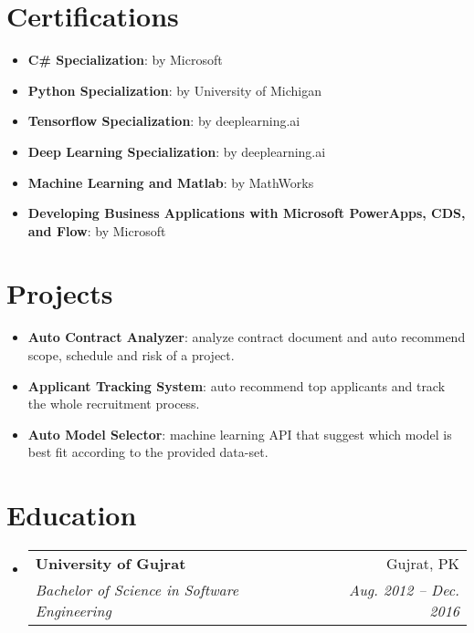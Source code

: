 \documentclass[letterpaper,11pt]{article}
\makeatletter
\newcommand{\resumeItem}[2]{
  \item\small{
    \textbf{#1}{: #2 \vspace{-2pt}}
  }
}
\newcommand{\resumeSubheading}[4]{
  \vspace{-1pt}\item
    \begin{tabular*}{0.97\textwidth}[t]{l@{\extracolsep{\fill}}r}
      \textbf{#1} & #2 \\
      \textit{\small#3} & \textit{\small #4} \\
    \end{tabular*}\vspace{-5pt}
}
\newcommand{\resumeSubItem}[2]{\resumeItem{#1}{#2}\vspace{-4pt}}
\newcommand{\resumeSubHeadingListStart}{\begin{itemize}[leftmargin=*]}
\newcommand{\resumeSubHeadingListEnd}{\end{itemize}}
\makeatother
\begin{document}
\section{Certifications}
  \resumeSubHeadingListStart
   \resumeSubItem{C\# Specialization}
      {by Microsoft}
       \resumeSubItem{Python Specialization}
      {by University of Michigan}
        \resumeSubItem{Tensorflow Specialization}
      {by deeplearning.ai}
    \resumeSubItem{Deep Learning Specialization}
      {by deeplearning.ai}
       \resumeSubItem{Machine Learning and Matlab}
      {by MathWorks}
    \resumeSubItem{Developing Business Applications with Microsoft PowerApps, CDS, and Flow}{by Microsoft}
    
     
  \resumeSubHeadingListEnd
  


\section{Projects}
  \resumeSubHeadingListStart
    \resumeSubItem{Auto Contract Analyzer}
      {analyze contract document and auto recommend scope, schedule and risk of a project.}
    \resumeSubItem{Applicant Tracking System}
      {auto recommend top applicants and track the whole recruitment process.}
    \resumeSubItem{Auto Model Selector}
      {machine learning API that suggest which  model is best fit according to the provided data-set.}
  \resumeSubHeadingListEnd
  


\section{Education}
  \resumeSubHeadingListStart
    \resumeSubheading
      {University of Gujrat}{Gujrat, PK}
      {Bachelor of Science in Software Engineering}{Aug. 2012 -- Dec. 2016}
  \resumeSubHeadingListEnd



\end{document}
